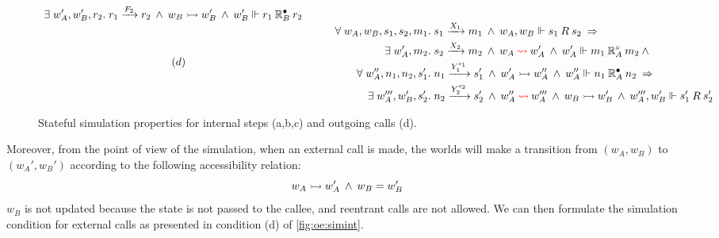 \begin{figure}
\[\begin{array}{c@{\qquad}l}
{\begin{aligned}
          \exists\; w'_A, w'_B, r_2.\;
          & r_1 \xrightarrow{F_2} r_2
          \:\wedge\:
          w_B \sysstep w'_B
          \:\wedge\:
          w'_B \Vdash r_1 \mathbin{\mathbb{R}_B^\ans} r_2
        \end{aligned}
      }
      \\
      (d) &
      {
        \begin{aligned}
          \forall\; w_A, w_B, s_1, s_2, m_1 .\;
          & s_1 \xrightarrow{X_1} m_1
          \:\wedge\:
          w_A, w_B \Vdash s_1 \mathbin{R} s_2
          \:\Rightarrow \\
          \exists\; w'_A, m_2.\;
          & s_2 \xrightarrow{X_2} m_2
          \:\wedge\:
          w_A \mathbin{\red{\envstep}} w'_A
          \:\wedge\:
          w'_A \Vdash m_1 \mathbin{\mathbb{R}_A^\que} m_2
          \:\wedge\: \\
          \forall\; w''_A, n_1, n_2, s_1'.\;
          & n_1 \xrightarrow{Y_1^{s_1}} s_1'
          \:\wedge\:
          w'_A \sysstep w''_A
          \:\wedge\:
          w''_A \Vdash n_1 \mathbin{\mathbb{R}_A^\ans} n_2
          \:\Rightarrow \\
          \exists\; w'''_A, w'_B, s'_2.\;
          & n_2 \xrightarrow{Y_2^{s_2}} s_2'
          \:\wedge\:
          w''_A \mathbin{\red{\envstep}} w'''_A
          \:\wedge\:
          w_B \sysstep w'_B
          \:\wedge\:
          w'''_A, w'_B \Vdash s_1' \mathbin{R} s_2'
        \end{aligned}
      }
    \end{array}
  \]
  \caption{Stateful simulation properties for internal steps (a,b,c)
  and outgoing calls (d).}
  \label{fig:oe:simint}
\end{figure}

Moreover,
from the point of view of the simulation,
when an external call is made,
the worlds will make a transition
from $(w_A, w_B)$ to $(w_A', w_B')$
according to
the following accessibility relation:
\[
  w_A \rightarrowtail w_A' \:\wedge\: w_B = w_B'
\]
$w_B$ is not updated
because the state is not passed
to the callee,
and reentrant calls are not allowed.
We can then formulate the simulation condition for external calls
as presented in condition (d) of \autoref{fig:oe:simint}.

